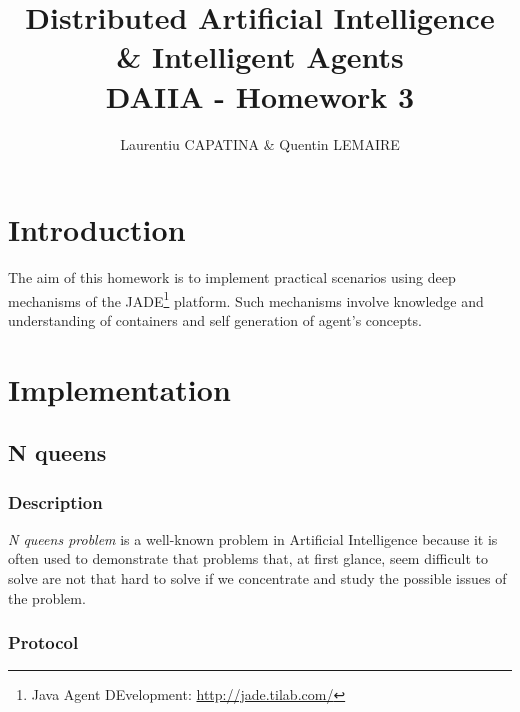 \documentclass[a4paper,11pt]{article}
\title{Distributed Artificial Intelligence \& Intelligent Agents \\ DAIIA - Homework 3}
\author{Laurentiu CAPATINA \& Quentin LEMAIRE}
\begin{document}
  \maketitle %

  \section{Introduction}
  
  The aim of this homework is to implement practical scenarios using deep 
mechanisms of the JADE\footnote{Java Agent DEvelopment: \href{http://jade.tilab.com/}{http://jade.tilab.com/}} 
  platform. Such mechanisms involve knowledge and understanding of containers and self 
  generation of agent's concepts.


  \newcommand{\pa}{\textit{Profiler Agent}}
  \newcommand{\cu}{\textit{Curator Agent}}
  \renewcommand{\to}{\textit{Tour Guide Agent}}
  \newcommand{\am}{\textit{Artist Manager Agent}}
  
  \section{Implementation}
  
  \subsection{N queens}

  \subsubsection{Description}
  
  \textit{N queens problem} is a well-known problem in Artificial Intelligence because it is often 
  used to demonstrate that problems that, at first glance, seem difficult to solve are not that 
  hard to solve if we concentrate and study the possible issues of the problem.
  
  \subsubsection{Protocol}
  
\end{document}
